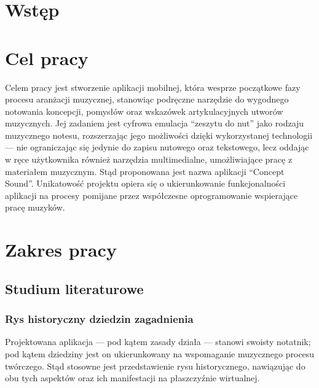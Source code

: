 \documentclass[12pt]{article}
\begin{document}
\newpage
\clearpage
\tableofcontents

\newpage
{}
\section*{Wstęp}

\newpage
{}
\section*{Cel pracy}
Celem pracy jest stworzenie aplikacji mobilnej, która wesprze początkowe fazy procesu aranżacji muzycznej,
stanowiąc podręczne narzędzie do wygodnego notowania koncepcji, pomysłów oraz wskazówek artykulacyjnych utworów muzycznych.
Jej zadaniem jest cyfrowa emulacja \enquote{zeszytu do nut} jako rodzaju muzycznego notesu, rozszerzając jego możliwości
dzięki wykorzystanej technologii — nie ograniczając się jedynie do zapisu nutowego oraz tekstowego,
lecz oddając w ręce użytkownika również narzędzia multimedialne, umożliwiające pracę z materiałem muzycznym.
Stąd proponowana jest nazwa aplikacji \enquote{Concept Sound}.
Unikatowość projektu opiera się o ukierunkowanie funkcjonalności aplikacji na procesy pomijane przez współczesne
oprogramowanie wspierające pracę muzyków.

\newpage
{}
\section{Zakres pracy}
\subsection{Studium literaturowe}
\subsubsection{Rys historyczny dziedzin zagadnienia}
Projektowana aplikacja — pod kątem zasady działa — stanowi swoisty notatnik; pod kątem dziedziny jest on ukierunkowany na wspomaganie
muzycznego procesu twórczego.
Stąd stosowne jest przedstawienie rysu historycznego, nawiązując do obu tych aspektów oraz ich manifestacji na płaszczyźnie wirtualnej.
\end{document}
